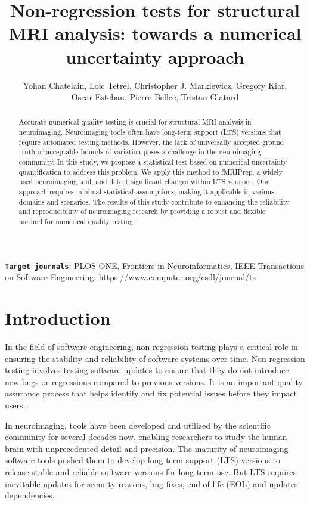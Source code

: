 \documentclass{article}
\title{Non-regression tests for structural MRI analysis: towards a numerical uncertainty approach}
\author{Yohan Chatelain, Loic Tetrel, Christopher J. Markiewicz, Gregory Kiar,\\ Oscar Esteban,  Pierre Bellec, Tristan Glatard}
\newcommand{\fmriprep}{fMRIPrep\xspace}
\begin{document}
\maketitle

\begin{abstract}
    Accurate numerical quality testing is crucial for structural MRI analysis in neuroimaging. Neuroimaging tools often have long-term support (LTS) versions that require automated testing methods. However, the lack of universally accepted ground truth or acceptable bounds of variation poses a challenge in the neuroimaging community. In this study, we propose a statistical test based on numerical uncertainty quantification to address this problem. We apply this method to \fmriprep, a widely used neuroimaging tool, and detect significant changes within LTS versions. Our approach requires minimal statistical assumptions, making it applicable in various domains and scenarios. The results of this study contribute to enhancing the reliability and reproducibility of neuroimaging research by providing a robust and flexible method for numerical quality testing.
\end{abstract}

{
\small
\textbf{\texttt{Target journals}}: PLOS ONE, Frontiers in Neuroinformatics,  IEEE Transactions on
Software Engineering. \url{https://www.computer.org/csdl/journal/ts}
}

\section{Introduction}

In the field of software engineering, non-regression testing plays a critical role in ensuring the stability and reliability of software systems over time. Non-regression testing involves testing software updates to ensure that they do not introduce new bugs or regressions compared to previous versions. It is an important quality assurance process that helps identify and fix potential issues before they impact users.

In neuroimaging, tools have been developed and utilized by the scientific community for several decades now, enabling researchers to study the human brain with unprecedented detail and precision.  The maturity of neuroimaging software tools pushed them to develop long-term support (LTS) versions
to release stable and reliable software versions for long-term use. But LTS requires inevitable updates for security reasons, bug fixes, end-of-life (EOL) and updates dependencies.
\end{document}
